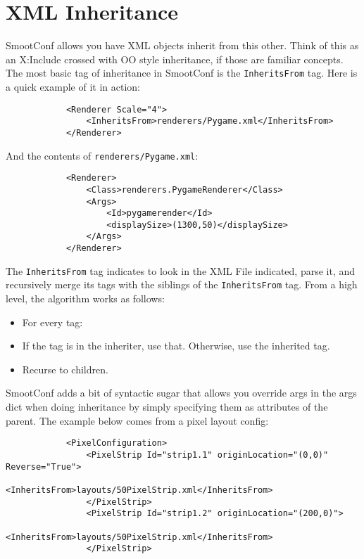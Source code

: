 \documentclass{article}
\begin{document}
    \section{XML Inheritance}
        SmootConf allows you have XML objects inherit from this other.  Think of this as an
        X:Include crossed with OO style inheritance, if those are familiar concepts.  The most basic
        tag of inheritance in SmootConf is the \texttt{InheritsFrom} tag.  Here is a quick example
        of it in action:
        \begin{verbatim}
            <Renderer Scale="4">
                <InheritsFrom>renderers/Pygame.xml</InheritsFrom>
            </Renderer>
        \end{verbatim}
        
        And the contents of \texttt{renderers/Pygame.xml}:
        \begin{verbatim}
            <Renderer>
                <Class>renderers.PygameRenderer</Class>
                <Args>
                    <Id>pygamerender</Id>
                    <displaySize>(1300,50)</displaySize>
                </Args>
            </Renderer>
        \end{verbatim}

        The \texttt{InheritsFrom} tag indicates to look in the XML File indicated, parse it, and
        recursively merge its tags with the siblings of the \texttt{InheritsFrom} tag.  From a high
        level, the algorithm works as follows:

        \begin{itemize}
            \item For every tag:
            \item If the tag is in the inheriter, use that.  Otherwise, use the inherited tag.  
            \item Recurse to children.
        \end{itemize}
        
        SmootConf adds a bit of syntactic sugar that allows you override args in the args dict when
        doing inheritance by simply specifying them as attributes of the parent.  The example below
        comes from a pixel layout config:
        \begin{verbatim}
            <PixelConfiguration>
                <PixelStrip Id="strip1.1" originLocation="(0,0)" Reverse="True">
                    <InheritsFrom>layouts/50PixelStrip.xml</InheritsFrom>
                </PixelStrip>
                <PixelStrip Id="strip1.2" originLocation="(200,0)">
                    <InheritsFrom>layouts/50PixelStrip.xml</InheritsFrom>
                </PixelStrip>
        \end{verbatim}
        
\end{document}
